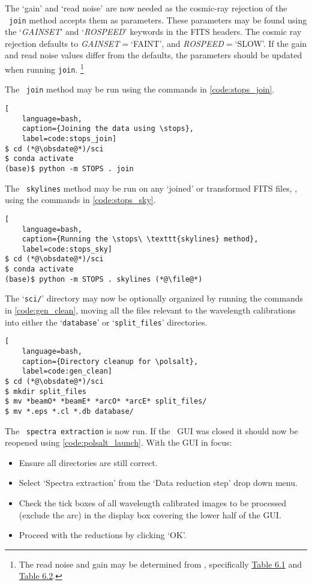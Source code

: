 The `gain' and `read noise' are now needed as the cosmic-ray rejection of the \stops\ \texttt{join} method accepts them as parameters. These parameters may be found using the `\textit{GAINSET}' and `\textit{ROSPEED}' keywords in the \gls{FITS} headers. The cosmic ray rejection defaults to \textit{GAINSET}$ = $`FAINT', and \textit{ROSPEED}$ = $`SLOW'. If the gain and read noise values differ from the defaults, the parameters should be updated when running \texttt{join}.%
\footnote{The read noise and gain may be determined from \citet{SALT_CFP}, specifically \href{https://pysalt.salt.ac.za/proposal\_calls/current/ProposalCall.html\#t.4}{Table 6.1} and \href{https://pysalt.salt.ac.za/proposal\_calls/current/ProposalCall.html\#t.5}{Table 6.2}.}

The \stops\ \texttt{join} method may be run using the commands in \autoref{code:stops_join}.

\begin{lstlisting}[
    language=bash,
    caption={Joining the data using \stops},
    label=code:stops_join]
$ cd (*@\obsdate@*)/sci
$ conda activate
(base)$ python -m STOPS . join
\end{lstlisting}

The \stops\ \texttt{skylines} method may be run on any `joined' or transformed \gls{FITS} files, \file, using the commands in \autoref{code:stops_sky}.

\begin{lstlisting}[
    language=bash,
    caption={Running the \stops\ \texttt{skylines} method},
    label=code:stops_sky]
$ cd (*@\obsdate@*)/sci
$ conda activate
(base)$ python -m STOPS . skylines (*@\file@*)
\end{lstlisting}

The `\texttt{sci/}' directory may now be optionally organized by running the commands in \autoref{code:gen_clean}, moving all the files relevant to the wavelength calibrations into either the `\texttt{database}' or `\texttt{split\_files}' directories.

\begin{lstlisting}[
    language=bash,
    caption={Directory cleanup for \polsalt},
    label=code:gen_clean]
$ cd (*@\obsdate@*)/sci
$ mkdir split_files
$ mv *beamO* *beamE* *arcO* *arcE* split_files/
$ mv *.eps *.cl *.db database/
\end{lstlisting}

The \polsalt\ \texttt{spectra extraction} is now run. If the \polsalt\ \gls{GUI} was closed it should now be reopened using \autoref{code:polsalt_launch}. With the \gls{GUI} in focus:
\begin{itemize}
    \item Ensure all directories are still correct.
    \item Select `Spectra extraction' from the `Data reduction step' drop down menu.
    \item Check the tick boxes of all wavelength calibrated images to be processed (exclude the arc) in the display box covering the lower half of the \gls{GUI}.
    \item Proceed with the reductions by clicking `OK'.
\end{itemize}

